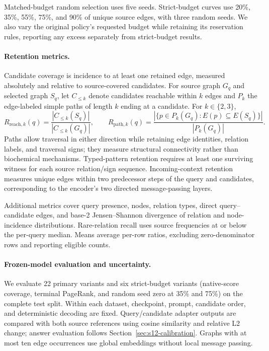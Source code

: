 \begin{revisionblock}
Matched-budget random selection uses five seeds. Strict-budget curves use 20\%, 35\%, 55\%, 75\%, and 90\% of unique source edges, with three random seeds. We also vary the original policy's requested budget while retaining its reservation rules, reporting any excess separately from strict-budget results.

\paragraph{Retention metrics.}
Candidate coverage is incidence to at least one retained edge, measured absolutely and relative to source-covered candidates. For source graph $G_q$ and selected graph $S_q$, let $C_{\leq k}$ denote candidates reachable within $k$ edges and $P_k$ the edge-labeled simple paths of length $k$ ending at a candidate. For $k\in\{2,3\}$,
\[
 R_{\mathrm{reach},k}(q)=
 \frac{|C_{\leq k}(S_q)|}{|C_{\leq k}(G_q)|},\qquad
 R_{\mathrm{path},k}(q)=
 \frac{|\{p\in P_k(G_q):E(p)\subseteq E(S_q)\}|}{|P_k(G_q)|}.
\]
Paths allow traversal in either direction while retaining edge identities, relation labels, and traversal signs; they measure structural connectivity rather than biochemical mechanisms. Typed-pattern retention requires at least one surviving witness for each source relation/sign sequence. Incoming-context retention measures unique edges within two predecessor steps of the query and candidates, corresponding to the encoder's two directed message-passing layers.

Additional metrics cover query presence, nodes, relation types, direct query--candidate edges, and base-2 Jensen--Shannon divergence of relation and node-incidence distributions. Rare-relation recall uses source frequencies at or below the per-query median. Means average per-row ratios, excluding zero-denominator rows and reporting eligible counts.

\paragraph{Frozen-model evaluation and uncertainty.}
We evaluate 22 primary variants and six strict-budget variants (native-score coverage, terminal PageRank, and random seed zero at 35\% and 75\%) on the complete test split. Within each dataset, checkpoint, prompt, candidate order, and deterministic decoding are fixed. Query/candidate adapter outputs are compared with both source references using cosine similarity and relative L2 change; answer evaluation follows Section~\ref{sec:s12-calibration}. Graphs with at most ten edge occurrences use global embeddings without local message passing.


\end{revisionblock}
